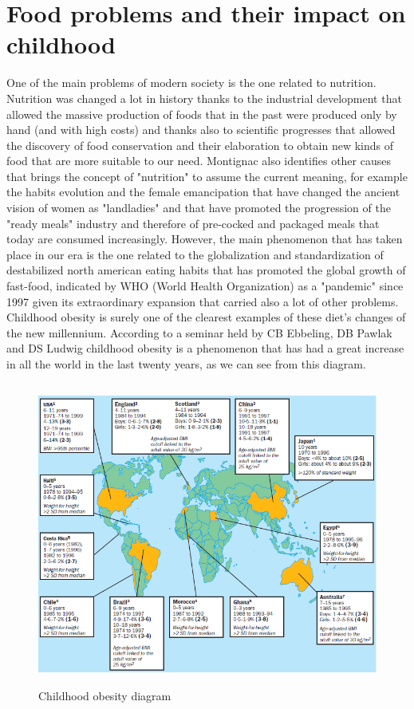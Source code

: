 \section{Food problems and their impact on childhood }
One of the main problems of modern society is the one related to nutrition. Nutrition was changed a lot in history thanks to the industrial development that allowed the massive production of foods that in the past were produced only by hand (and with high costs) and thanks also to scientific progresses that allowed the discovery of food conservation and their elaboration to obtain new kinds of food that are more suitable to our need. Montignac \cite{Lastoriadell'alimentazionedell'uomo.} also identifies other causes that brings the concept of "nutrition" to assume the current meaning, for example the habits evolution and the female emancipation that have changed the ancient vision of women as "landladies" and that have promoted the progression of the "ready meals" industry and therefore of pre-cocked and packaged meals that today are consumed increasingly. However, the main phenomenon that has taken place in our era is the one related to the globalization and standardization of destabilized north american eating habits that has promoted the global growth of fast-food, indicated by WHO (World Health Organization) as a "pandemic" since 1997 given its extraordinary expansion that carried also a lot of other problems.\\
Childhood obesity is surely one of the clearest examples of these diet's changes of the new millennium.
According to a seminar held by CB Ebbeling, DB Pawlak and DS Ludwig \cite{Childhoodobesity} childhood obesity is a phenomenon that has had a great increase in all the world in the last twenty years, as we can see from this diagram.\clearpage
\begin{figure}[H]
\centering
\includegraphics[width=13cm, height=10cm]{immagini/obesity.png}
\caption{Childhood obesity diagram}\label{fig:obesity}
\end{figure}
